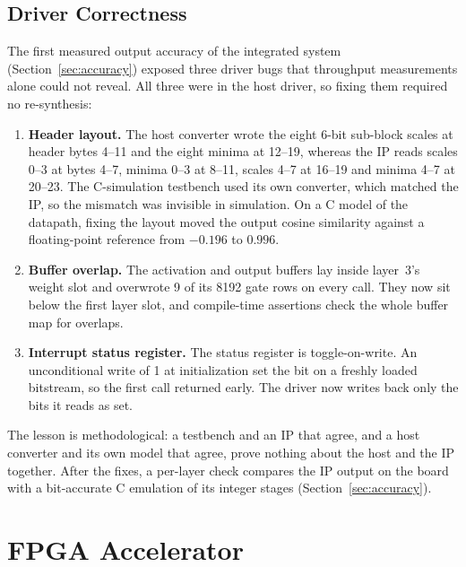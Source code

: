 \subsection{Driver Correctness}
\label{subsec:driver_bugs}
The first measured output accuracy of the integrated system (Section~\ref{sec:accuracy})
exposed three driver bugs that throughput measurements alone could not reveal. All three
were in the host driver, so fixing them required no re-synthesis:
\begin{enumerate}
    \item \textbf{Header layout.} The host converter wrote the eight 6-bit sub-block
    scales at header bytes 4--11 and the eight minima at 12--19, whereas the IP reads
    scales 0--3 at bytes 4--7, minima 0--3 at 8--11, scales 4--7 at 16--19 and minima 4--7
    at 20--23. The C-simulation testbench used its own converter, which matched the IP,
    so the mismatch was invisible in simulation. On a C model of the datapath, fixing the
    layout moved the output cosine similarity against a floating-point reference from
    $-0.196$ to $0.996$.
    \item \textbf{Buffer overlap.} The activation and output buffers lay inside layer~3's
    weight slot and overwrote 9 of its 8192 gate rows on every call. They now sit below
    the first layer slot, and compile-time assertions check the whole buffer map for
    overlaps.
    \item \textbf{Interrupt status register.} The status register is toggle-on-write. An
    unconditional write of 1 at initialization set the bit on a freshly loaded bitstream,
    so the first call returned early. The driver now writes back only the bits it reads
    as set.
\end{enumerate}
The lesson is methodological: a testbench and an IP that agree, and a host converter and
its own model that agree, prove nothing about the host and the IP together. After the
fixes, a per-layer check compares the IP output on the board with a bit-accurate C
emulation of its integer stages (Section~\ref{sec:accuracy}).

\section{FPGA Accelerator}
\label{sec:fpga}

